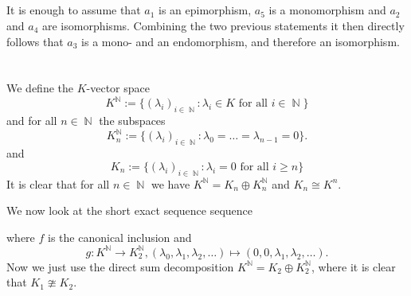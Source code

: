 \documentclass[a4paper,10pt]{article}
\theoremstyle{definition}
\newcommand{\N}{{\operatorname{\mathbb{N}}}}
\begin{document}
\subsection{}
It is enough to assume that $a_1$ is an epimorphism, $a_5$ is a monomorphism and $a_2$ and $a_4$ are isomorphisms. Combining the two previous statements it then directly follows that $a_3$ is a mono- and an endomorphism, and therefore an isomorphism.





\addtocounter{section}{1}





\section{}
We define the $K$-vector space
\[
 K^\N := \{ (\lambda_i)_{i \in \N} : \lambda_i \in K \text{ for all } i \in \N \}
\]
and for all $n \in \N$ the subspaces
\[
 K^\N_n := \{(\lambda_i)_{i \in \N} : \lambda_0 = \ldots = \lambda_{n-1} = 0\}.
\]
and
\[
 K_n := \{(\lambda_i)_{i \in \N} : \lambda_i = 0 \text{ for all } i \geq n\}
\]
It is clear that for all $n \in \N$ we have $K^\N = K_n \oplus K^\N_n$ and $K_n \cong K^n$.

We now look at the short exact sequence sequence
\begin{center}
\end{center}
where $f$ is the canonical inclusion and
\[
 g: K^\N \to K^\N_2, (\lambda_0, \lambda_1, \lambda_2, \ldots) \mapsto (0,0,\lambda_1, \lambda_2, \ldots).
\]
Now we just use the direct sum decomposition $K^\N = K_2 \oplus K^\N_2$, where it is clear that $K_1 \ncong K_2$.
\end{document}
